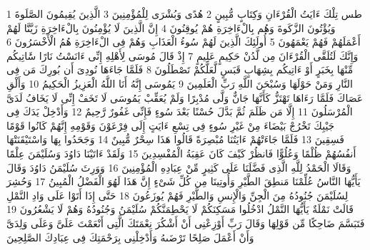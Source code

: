 \documentclass[20pt,a4paper]{article}
\title{}
\author{}
\date{}
\begin{document}
\pagecolor{cl_page}



{\tiny\colorbox{cl_aya}{1}} طس تِلْكَ ءَايَتُ الْقُرْءَانِ وَكِتَابٍ مُّبِينٍ
{\tiny\colorbox{cl_aya}{2}} هُدًى وَبُشْرَى لِلْمُؤْمِنِينَ
{\tiny\colorbox{cl_aya}{3}} الَّذِينَ يُقِيمُونَ الصَّلَوةَ وَيُؤْتُونَ الزَّكَوةَ وَهُم بِالْءَاخِرَةِ هُمْ يُوقِنُونَ
{\tiny\colorbox{cl_aya}{4}} إِنَّ الَّذِينَ لَا يُؤْمِنُونَ بِالْءَاخِرَةِ زَيَّنَّا لَهُمْ أَعْمَلَهُمْ فَهُمْ يَعْمَهُونَ
{\tiny\colorbox{cl_aya}{5}} أُولَئِكَ الَّذِينَ لَهُمْ سُوءُ الْعَذَابِ وَهُمْ فِى الْءَاخِرَةِ هُمُ الْأَخْسَرُونَ
{\tiny\colorbox{cl_aya}{6}} وَإِنَّكَ لَتُلَقَّى الْقُرْءَانَ مِن لَّدُنْ حَكِيمٍ عَلِيمٍ
{\tiny\colorbox{cl_aya}{7}} إِذْ قَالَ مُوسَى لِأَهْلِهِ إِنِّى ءَانَسْتُ نَارًا سََٔاتِيكُم مِّنْهَا بِخَبَرٍ أَوْ ءَاتِيكُم بِشِهَابٍ قَبَسٍ لَّعَلَّكُمْ تَصْطَلُونَ
{\tiny\colorbox{cl_aya}{8}} فَلَمَّا جَاءَهَا نُودِىَ أَن بُورِكَ مَن فِى النَّارِ وَمَنْ حَوْلَهَا وَسُبْحَنَ اللَّهِ رَبِّ الْعَلَمِينَ
{\tiny\colorbox{cl_aya}{9}} يَمُوسَى إِنَّهُ أَنَا اللَّهُ الْعَزِيزُ الْحَكِيمُ
{\tiny\colorbox{cl_aya}{10}} وَأَلْقِ عَصَاكَ فَلَمَّا رَءَاهَا تَهْتَزُّ كَأَنَّهَا جَانٌّ وَلَّى مُدْبِرًا وَلَمْ يُعَقِّبْ يَمُوسَى لَا تَخَفْ إِنِّى لَا يَخَافُ لَدَىَّ الْمُرْسَلُونَ
{\tiny\colorbox{cl_aya}{11}} إِلَّا مَن ظَلَمَ ثُمَّ بَدَّلَ حُسْنًا بَعْدَ سُوءٍ فَإِنِّى غَفُورٌ رَّحِيمٌ
{\tiny\colorbox{cl_aya}{12}} وَأَدْخِلْ يَدَكَ فِى جَيْبِكَ تَخْرُجْ بَيْضَاءَ مِنْ غَيْرِ سُوءٍ فِى تِسْعِ ءَايَتٍ إِلَى فِرْعَوْنَ وَقَوْمِهِ إِنَّهُمْ كَانُوا قَوْمًا فَسِقِينَ
{\tiny\colorbox{cl_aya}{13}} فَلَمَّا جَاءَتْهُمْ ءَايَتُنَا مُبْصِرَةً قَالُوا هَذَا سِحْرٌ مُّبِينٌ
{\tiny\colorbox{cl_aya}{14}} وَجَحَدُوا بِهَا وَاسْتَيْقَنَتْهَا أَنفُسُهُمْ ظُلْمًا وَعُلُوًّا فَانظُرْ كَيْفَ كَانَ عَقِبَةُ الْمُفْسِدِينَ
{\tiny\colorbox{cl_aya}{15}} وَلَقَدْ ءَاتَيْنَا دَاوُدَ وَسُلَيْمَنَ عِلْمًا وَقَالَا الْحَمْدُ لِلَّهِ الَّذِى فَضَّلَنَا عَلَى كَثِيرٍ مِّنْ عِبَادِهِ الْمُؤْمِنِينَ
{\tiny\colorbox{cl_aya}{16}} وَوَرِثَ سُلَيْمَنُ دَاوُدَ وَقَالَ يَأَيُّهَا النَّاسُ عُلِّمْنَا مَنطِقَ الطَّيْرِ وَأُوتِينَا مِن كُلِّ شَىْءٍ إِنَّ هَذَا لَهُوَ الْفَضْلُ الْمُبِينُ
{\tiny\colorbox{cl_aya}{17}} وَحُشِرَ لِسُلَيْمَنَ جُنُودُهُ مِنَ الْجِنِّ وَالْإِنسِ وَالطَّيْرِ فَهُمْ يُوزَعُونَ
{\tiny\colorbox{cl_aya}{18}} حَتَّى إِذَا أَتَوْا عَلَى وَادِ النَّمْلِ قَالَتْ نَمْلَةٌ يَأَيُّهَا النَّمْلُ ادْخُلُوا مَسَكِنَكُمْ لَا يَحْطِمَنَّكُمْ سُلَيْمَنُ وَجُنُودُهُ وَهُمْ لَا يَشْعُرُونَ
{\tiny\colorbox{cl_aya}{19}} فَتَبَسَّمَ ضَاحِكًا مِّن قَوْلِهَا وَقَالَ رَبِّ أَوْزِعْنِى أَنْ أَشْكُرَ نِعْمَتَكَ الَّتِى أَنْعَمْتَ عَلَىَّ وَعَلَى وَلِدَىَّ وَأَنْ أَعْمَلَ صَلِحًا تَرْضَىهُ وَأَدْخِلْنِى بِرَحْمَتِكَ فِى عِبَادِكَ الصَّلِحِينَ
\end{document}
